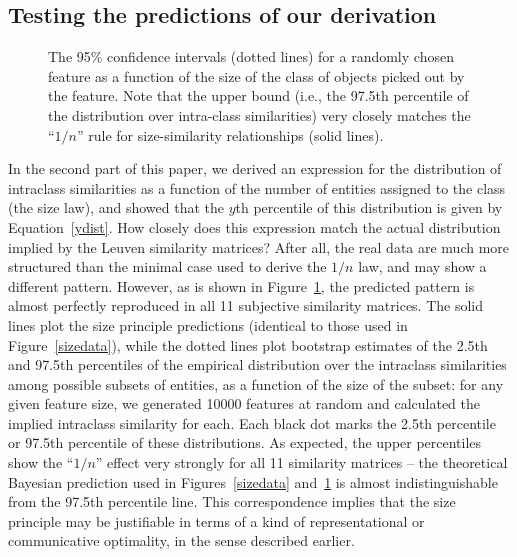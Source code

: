 \documentclass{apa}
\begin{document}
\subsection{Testing the predictions of our derivation}

\begin{figure}
\begin{center}
\hspace*{-2cm}
\caption{The 95\% confidence intervals (dotted lines) for a randomly chosen feature as a function of the size of the class of objects picked out by the feature. Note that the upper bound (i.e., the 97.5th percentile of the distribution over intra-class similarities) very closely matches the ``$1/n$'' rule for size-similarity relationships (solid lines).}
\label{awesome}
\end{center}
\end{figure}

In the second part of this paper, we derived an expression for the distribution of intraclass similarities as a function of the number of entities assigned to the class (the size law), and showed that the $y$th percentile of this distribution is given by Equation~\ref{ydist}. How closely does this expression match the actual distribution implied by the Leuven similarity matrices? After all, the real data are much more structured than the minimal case used to derive the $1/n$ law, and may show a different pattern. However, as is shown in Figure~\ref{awesome}, the predicted pattern is almost perfectly reproduced in all 11 subjective similarity matrices. The solid lines plot the size principle predictions (identical to those used in Figure~\ref{sizedata}), while the dotted lines plot bootstrap estimates of the 2.5th and 97.5th percentiles of the empirical distribution over the intraclass similarities among possible subsets of entities, as a function of the size of the subset: for any given feature size, we generated 10000 features at random and calculated the implied intraclass similarity for each. Each black dot marks the 2.5th percentile or 97.5th percentile of these distributions. As expected, the upper percentiles show the ``$1/n$'' effect very strongly for all 11 similarity matrices -- the theoretical Bayesian prediction used in Figures~\ref{sizedata} and~\ref{awesome} is almost indistinguishable from the 97.5th percentile line. This correspondence implies that the size principle may be justifiable in terms of a kind of representational or communicative optimality, in the sense described earlier.
\end{document}
